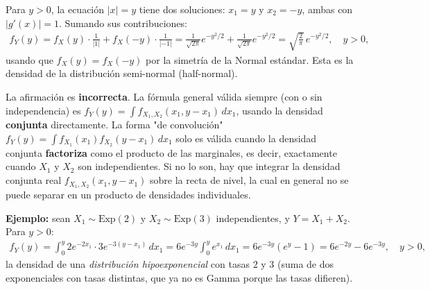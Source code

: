 \begin{solproblema}[prob:43a7344]
	Para $y>0$, la ecuación $|x|=y$ tiene dos soluciones: $x_1=y$ y $x_2=-y$, ambas con $|g'(x)|=1$. Sumando sus contribuciones:
	\begin{align*}
		f_Y(y) = f_X(y)\cdot\frac{1}{|1|} + f_X(-y)\cdot\frac{1}{|-1|} = \frac{1}{\sqrt{2\pi}}e^{-y^2/2} + \frac{1}{\sqrt{2\pi}}e^{-y^2/2} = \sqrt{\frac{2}{\pi}}\,e^{-y^2/2}, \quad y>0,
	\end{align*}
	usando que $f_X(y)=f_X(-y)$ por la simetría de la Normal estándar. Esta es la densidad de la distribución semi-normal (half-normal).
\end{solproblema}

\begin{solproblema}[prob:df21aa1]
	La afirmación es \textbf{incorrecta}. La fórmula general válida siempre (con o sin independencia) es $f_Y(y) = \int f_{X_1,X_2}(x_1,y-x_1)\,dx_1$, usando la densidad \textbf{conjunta} directamente. La forma "de convolución" $f_Y(y)=\int f_{X_1}(x_1)f_{X_2}(y-x_1)\,dx_1$ solo es válida cuando la densidad conjunta \textbf{factoriza} como el producto de las marginales, es decir, exactamente cuando $X_1$ y $X_2$ son independientes. Si no lo son, hay que integrar la densidad conjunta real $f_{X_1,X_2}(x_1,y-x_1)$ sobre la recta de nivel, la cual en general no se puede separar en un producto de densidades individuales.
\end{solproblema}

\begin{solproblema}[prob:db5d952]
	\textbf{Ejemplo:} sean $X_1\sim\text{Exp}(2)$ y $X_2\sim\text{Exp}(3)$ independientes, y $Y=X_1+X_2$. Para $y>0$:
	\begin{align*}
		f_Y(y) = \int_0^y 2e^{-2x_1}\cdot 3e^{-3(y-x_1)}\,dx_1 = 6e^{-3y}\int_0^y e^{x_1}\,dx_1 = 6e^{-3y}(e^y-1) = 6e^{-2y}-6e^{-3y}, \quad y>0,
	\end{align*}
	la densidad de una \emph{distribución hipoexponencial} con tasas $2$ y $3$ (suma de dos exponenciales con tasas distintas, que ya no es Gamma porque las tasas difieren).
\end{solproblema}
